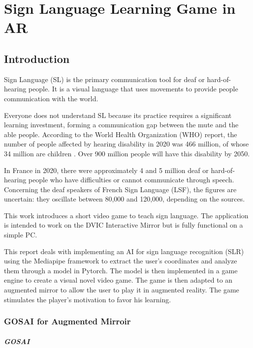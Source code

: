 \chapter{Sign Language Learning Game in AR}

\section{Introduction}

Sign Language (SL) is the primary communication tool for deaf or hard-of-hearing people. It is a visual language that uses movements to provide people communication with the world. 

Everyone does not understand SL because its practice requires a significant learning investment, forming a communication gap between the mute and the able people. According to the World Health Organization (WHO) report, the number of people affected by hearing disability in 2020 was 466 million, of whose 34 million are children \cite{el2020sign}. Over 900 million people will have this disability by 2050.

In France in 2020, there were approximately 4 and 5 million deaf or hard-of-hearing people who have difficulties or cannot communicate through speech. Concerning the deaf speakers of French Sign Language (LSF), the figures are uncertain: they oscillate between 80,000 and 120,000, depending on the sources.

This work introduces a short video game to teach sign language. The application is intended to work on the DVIC Interactive Mirror but is fully functional on a simple PC.

This report deals with implementing an AI for sign language recognition (SLR) using the Mediapipe framework to extract the user's coordinates and analyze them through a model in Pytorch. The model is then implemented in a game engine to create a visual novel video game. The game is then adapted to an augmented mirror to allow the user to play it in augmented reality. The game stimulates the player's motivation to favor his learning.

\subsection{GOSAI for Augmented Mirroir}

\paragraph[short]{GOSAI}

